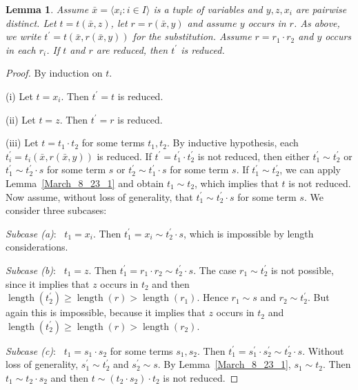 \documentclass[10pt,a4paper]{article}
\DeclareMathOperator{\len}{length}
\theoremstyle{note}
\newtheorem{lemma}[thm]{Lemma}
\begin{document}
\begin{lemma}\label{March_8_23_2} %
Assume $\bar{x}= \langle x_i : i \in I\rangle$ is a tuple of variables and  $y,z,x_i$ are pairwise distinct. Let  $t=t(\bar{x},z)$,  let $r=r(\bar{x},y)$  and assume $y$ occurs in $r$. As above, we write  $t^\prime= t(\bar{x},r(\bar{x},y))$  for the substitution. Assume $r=r_1\cdot r_2$ and $y$ occurs in each $r_i$.  If $t$ and $r$ are reduced, then $t^\prime$ is reduced.
\end{lemma}
\begin{proof} By  induction on $t$.

(i) Let $t=x_i$.  Then  $t^\prime = t$  is reduced.

(ii) Let $t=z$. Then $t^\prime = r$ is reduced.

(iii) Let $t= t_1\cdot t_2$  for some terms $t_1,t_2$. By inductive hypothesis, each  $t_i^\prime =t_i(\bar{x},r(\bar{x},y))$  is reduced.  If $t^\prime =t_1^\prime\cdot t_2^\prime$ is not reduced, then either  $t_1^\prime\sim t_2^\prime$  or  $t_1^\prime\sim t_2^\prime\cdot s$  for some term $s$  or  $t_2^\prime\sim t_1^\prime\cdot s$  for some term $s$.  If $t_1^\prime\sim t_2^\prime$, we can apply Lemma~\ref{March_8_23_1} and obtain $t_1\sim t_2$, which implies that $t$ is not reduced.  Now assume, without loss of generality, that $t_1^\prime\sim t_2^\prime\cdot s$  for some term $s$.  We consider three subcases:

\textit{Subcase (a)}: \ $t_1=x_i$. Then  $t_1^\prime = x_i\sim t_2^\prime\cdot s$, which is impossible by length considerations.

\textit{Subcase (b)}: \ $t_1 = z$.  Then $t_1^\prime=r_1\cdot r_2\sim t_2^\prime\cdot s$. The case  $r_1\sim t_2^\prime$  is not possible, since  it implies that $z$ occurs in $t_2$ and then $\len(t_2^\prime)\geq \len (r)>\len(r_1)$. Hence  $r_1\sim s$ and $r_2\sim t_2^\prime$.  But again this is impossible, because it implies that $z$ occurs in $t_2$ and $\len(t_2^\prime)\geq \len(r)>\len(r_2)$.

\textit{Subcase (c)}: \  $t_1= s_1\cdot s_2$  for some terms $s_1,s_2$. Then $t_1^\prime=s_1^\prime\cdot s_2^\prime\sim t_2^\prime\cdot s$. Without loss of generality, $s_1^\prime\sim t_2^\prime$ and $s_2^\prime\sim s$. By  Lemma~\ref{March_8_23_1}, $s_1\sim t_2$. Then $t_1\sim t_2\cdot s_2$  and then  $t\sim (t_2\cdot s_2)\cdot t_2$  is not reduced.
\end{proof}
\end{document}

